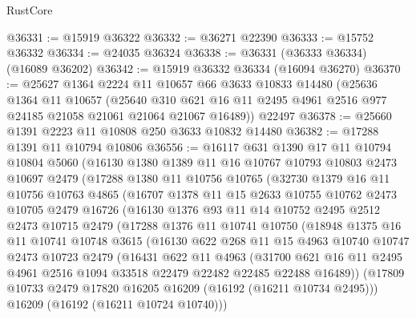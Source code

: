 \begin{lexlean}{RustCore}
\begin{coremodule}
@36331 := @15919 @36322
@36332 := @36271 @22390
@36333 := @15752 @36332
@36334 := @24035 @36324
@36338 := @36331 (@36333 @36334) (@16089 @36202)
@36342 := @15919 @36332 @36334 (@16094 @36270)
@36370 := @25627
    @1364
    @2224
    @11
    @10657
    @66
    @3633
    @10833
    @14480
    (@25636
      @1364
      @11
      @10657
      (@25640 @310 @621 @16 @11 @2495 @4961 @2516 @977 @24185 @21058 @21061 @21064 @21067 @16489))
    @22497
@36378 := @25660 @1391 @2223 @11 @10808 @250 @3633 @10832 @14480
@36382 := @17288 @1391 @11 @10794 @10806
@36556 := @16117
    @631
    @1390
    @17
    @11
    @10794
    @10804
    @5060
    (@16130
      @1380
      @1389
      @11
      @16
      @10767
      @10793
      @10803
      @2473
      @10697
      @2479
      (@17288
        @1380
        @11
        @10756
        @10765
        (@32730
          @1379
          @16
          @11
          @10756
          @10763
          @4865
          (@16707
            @1378
            @11
            @15
            @2633
            @10755
            @10762
            @2473
            @10705
            @2479
            @16726
            (@16130
              @1376
              @93
              @11
              @14
              @10752
              @2495
              @2512
              @2473
              @10715
              @2479
              (@17288
                @1376
                @11
                @10741
                @10750
                (@18948
                  @1375
                  @16
                  @11
                  @10741
                  @10748
                  @3615
                  (@16130
                    @622
                    @268
                    @11
                    @15
                    @4963
                    @10740
                    @10747
                    @2473
                    @10723
                    @2479
                    (@16431
                      @622
                      @11
                      @4963
                      (@31700
                        @621
                        @16
                        @11
                        @2495
                        @4961
                        @2516
                        @1094
                        @33518
                        @22479
                        @22482
                        @22485
                        @22488
                        @16489))
                    (@17809 @10733 @2479 @17820 @16205 @16209 (@16192 (@16211 @10734 @2495)))
                    @16209
                    (@16192 (@16211 @10724 @10740)))

\end{coremodule}
\end{lexlean}
